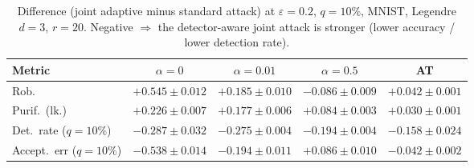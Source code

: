 \begin{table}[htbp]
  \centering
  \begin{tabular}{lcccc}
    \toprule
    Metric & $\alpha{=}0$ & $\alpha{=}0.01$ & $\alpha{=}0.5$ & AT \\
    \midrule
    Rob. & $+0.545 \pm 0.012$ & $+0.185 \pm 0.010$ & $-0.086 \pm 0.009$ & $+0.042 \pm 0.001$ \\
    Purif.\ (lk.) & $+0.226 \pm 0.007$ & $+0.177 \pm 0.006$ & $+0.084 \pm 0.003$ & $+0.030 \pm 0.001$ \\
    Det.\ rate ($q{=}10\%$) & $-0.287 \pm 0.032$ & $-0.275 \pm 0.004$ & $-0.194 \pm 0.004$ & $-0.158 \pm 0.024$ \\
    Accept.\ err ($q{=}10\%$) & $-0.538 \pm 0.014$ & $-0.194 \pm 0.011$ & $+0.086 \pm 0.010$ & $-0.042 \pm 0.002$ \\
    \bottomrule
  \end{tabular}
  \caption{Difference (joint adaptive minus standard attack) at $\varepsilon=0.2$, $q{=}10\%$, MNIST, Legendre $d{=}3$, $r{=}20$. Negative $\Rightarrow$ the detector-aware joint attack is stronger (lower accuracy / lower detection rate).}
  \label{tab:joint_vs_normal_mnist_eps0.2}
\end{table}
